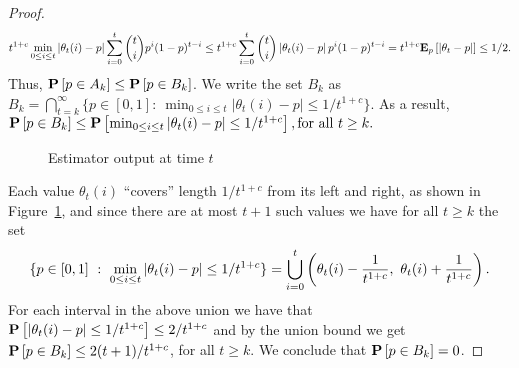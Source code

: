 \begin{proof}
  \[
    t^{1 + c} \min_{0 \leq i \leq t} \left| \theta_t(i) - p \right|
    \sum_{i=0}^t \binom{t}{i} p^i (1-p)^{t-i}
    \leq
    t^{1 + c} \sum_{i=0}^t \binom{t}{i} \left| \theta_t(i) - p \right| p^i (1-p)^{t-i}
    = t^{1+c} \bm{\mathrm{E}}_{p} \left[ |\theta_t  - p | \right]
    \leq
    1/2.
  \]
  Thus, $\bm{\mathrm{P}}\left[p \in A_k\right] \leq \bm{\mathrm{P}}\left[p \in B_k\right]$.
  We write the set $B_k$ as \(
    B_k = \bigcap_{t=k}^{\infty}\{p \in [0,1]:~ \min_{0 \leq
      i \leq t} |\theta_t(i)-p|\leq 1/t^{1+c}
    \}.
  \)
  As a result,
  \(
    \bm{\mathrm{P}}\left[p \in B_k\right]
    \leq \bm{\mathrm{P}}\left[\min_{0 \leq i \leq t}|\theta_t(i)-p| \leq 1/t^{1+c} \right],
    \text{for all } t \geq k.
  \)
  \begin{figure}
    \centering
    \caption{Estimator output at time $t$} \label{fig:estimator}
  \end{figure}
  Each value $\theta_t(i)$ \enquote{covers} length $1/t^{1+c}$ from
  its left and right, as shown in Figure~\ref{fig:estimator},
  and since there are at most $t+1$ such values
  we have for all $t \geq k$ the set
  \[
    \{
    p \in [0,1]\ :\ {\min_{0 \leq i \leq t} |\theta_t(i)-p| \leq 1/t^{1+c} }
    \}
    =
    \bigcup_{i=0}^t
    \left(
    \theta_t(i) - \frac{1}{t^{1+c}},\ \theta_t(i) + \frac{1}{t^{1+c}}
    \right).
  \]
  For each interval in the above union we have that
  $\bm{\mathrm{P}}\left[|\theta_t(i)-p| \leq 1/t^{1+c}\right]\leq 2/t^{1+c}$
  and by the union bound we get
  $\bm{\mathrm{P}}\left[p \in B_k\right] \leq 2(t+1)/t^{1+c}$, for all $t \geq k$.
  We conclude that $\bm{\mathrm{P}}\left[p \in B_k\right] =0$.
\end{proof}

